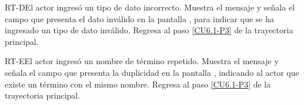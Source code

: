 	\begin{UCtrayectoriaA}{RT-D}{El actor ingresó un tipo de dato incorrecto.}
		\UCpaso[\UCsist] Muestra el mensaje  y señala el campo que presenta el dato inválido en la pantalla , para indicar que se ha ingresado un tipo de dato inválido.
		\UCpaso Regresa al paso \ref{CU6.1-P3} de la trayectoria principal.
	\end{UCtrayectoriaA}
	
	\begin{UCtrayectoriaA}{RT-E}{El actor ingresó un nombre de término repetido.}
		\UCpaso[\UCsist] Muestra el mensaje  y señala el campo que presenta la duplicidad en la pantalla , indicando al actor que existe un término con el mismo nombre.
		\UCpaso Regresa al paso \ref{CU6.1-P3} de la trayectoria principal.
	\end{UCtrayectoriaA}


